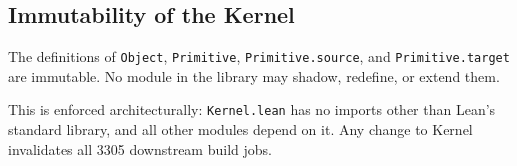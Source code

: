 \subsection{Immutability of the Kernel}

\begin{note}
The definitions of \texttt{Object}, \texttt{Primitive},
\texttt{Primitive.source}, and \texttt{Primitive.target} are immutable. No module
in the library may shadow, redefine, or extend them.
\end{note}

This is enforced architecturally: \texttt{Kernel.lean} has no imports other than
Lean's standard library, and all other modules depend on it. Any change to
Kernel invalidates all 3305 downstream build jobs.
